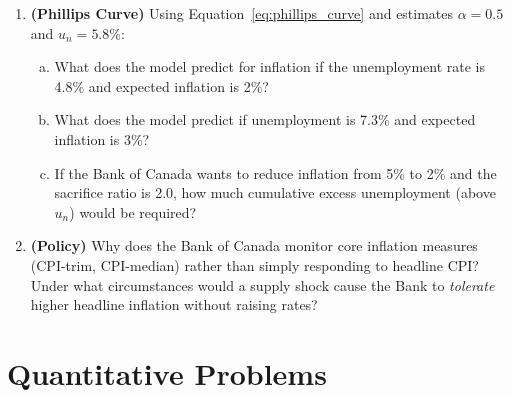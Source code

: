 \begin{enumerate}
\item \textbf{(Phillips Curve)} Using Equation~\ref{eq:phillips_curve}
and estimates $\alpha = 0.5$ and $u_n = 5.8\%$:
\begin{enumerate}[(a)]
  \item What does the model predict for inflation if the unemployment
        rate is 4.8\% and expected inflation is 2\%?
  \item What does the model predict if unemployment is 7.3\% and
        expected inflation is 3\%?
  \item If the Bank of Canada wants to reduce inflation from 5\% to 2\%
        and the sacrifice ratio is 2.0, how much cumulative excess
        unemployment (above $u_n$) would be required?
\end{enumerate}

\item \textbf{(Policy)} Why does the Bank of Canada monitor core inflation
measures (CPI-trim, CPI-median) rather than simply responding to headline
CPI? Under what circumstances would a supply shock cause the Bank to
\textit{tolerate} higher headline inflation without raising rates?

\end{enumerate}

\section*{Quantitative Problems}


